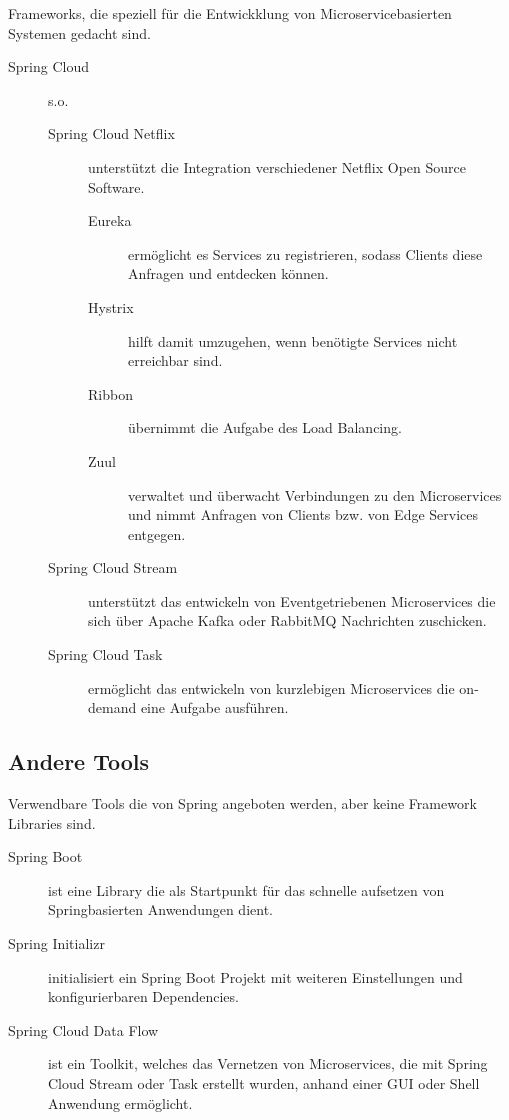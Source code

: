 \documentclass{article}
\begin{document}
Frameworks, die speziell für die Entwickklung von Microservicebasierten Systemen gedacht sind.

\begin{description}
    \item[Spring Cloud] s.o.
    \begin{description}
        \item[Spring Cloud Netflix] unterstützt die Integration verschiedener Netflix Open Source Software.
        \begin{description}
            \item[Eureka] ermöglicht es Services zu registrieren, sodass Clients diese Anfragen und entdecken können.
            \item[Hystrix] hilft damit umzugehen, wenn benötigte Services nicht erreichbar sind.
            \item[Ribbon] übernimmt die Aufgabe des Load Balancing.
            \item[Zuul] verwaltet und überwacht Verbindungen zu den Microservices und nimmt Anfragen von Clients bzw. von Edge Services entgegen.
        \end{description}

        \item[Spring Cloud Stream] unterstützt das entwickeln von Eventgetriebenen Microservices die sich über Apache Kafka oder RabbitMQ Nachrichten zuschicken.
        \item[Spring Cloud Task] ermöglicht das entwickeln von kurzlebigen Microservices die on-demand eine Aufgabe ausführen.
    \end{description}
\end{description}

\subsection{Andere Tools}

Verwendbare Tools die von Spring angeboten werden, aber keine Framework Libraries sind.

\begin{description}
    \item[Spring Boot] ist eine Library die als Startpunkt für das schnelle aufsetzen von Springbasierten Anwendungen dient.
    \item[Spring Initializr] initialisiert ein Spring Boot Projekt mit weiteren Einstellungen und konfigurierbaren Dependencies.
    \item[Spring Cloud Data Flow] ist ein Toolkit, welches das Vernetzen von Microservices, die mit Spring Cloud Stream oder Task erstellt wurden, anhand einer GUI oder Shell Anwendung ermöglicht.
\end{description}
\end{document}
